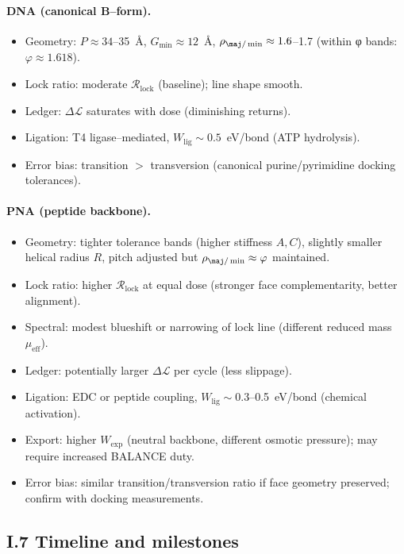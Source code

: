 \documentclass[11pt]{article}
\begin{document}
\paragraph{DNA (canonical B–form).}
\begin{itemize}
\item Geometry: $P\approx 34$–35~\AA, $G_{\min}\approx 12$~\AA, $\rho_{\maj/\min}\approx 1.6$–1.7 (within φ bands: $\varphi\approx 1.618$).
\item Lock ratio: moderate $\mathcal{R}_{\mathrm{lock}}$ (baseline); line shape smooth.
\item Ledger: $\Delta\mathcal{L}$ saturates with dose (diminishing returns).
\item Ligation: T4 ligase–mediated, $W_{\mathrm{lig}}\sim 0.5$~eV/bond (ATP hydrolysis).
\item Error bias: transition $>$ transversion (canonical purine/pyrimidine docking tolerances).
\end{itemize}

\paragraph{PNA (peptide backbone).}
\begin{itemize}
\item Geometry: tighter tolerance bands (higher stiffness $A,C$), slightly smaller helical radius $R$, pitch adjusted but $\rho_{\maj/\min}\approx\varphi$ maintained.
\item Lock ratio: higher $\mathcal{R}_{\mathrm{lock}}$ at equal dose (stronger face complementarity, better alignment).
\item Spectral: modest blueshift or narrowing of lock line (different reduced mass $\mu_{\mathrm{eff}}$).
\item Ledger: potentially larger $\Delta\mathcal{L}$ per cycle (less slippage).
\item Ligation: EDC or peptide coupling, $W_{\mathrm{lig}}\sim 0.3$–0.5~eV/bond (chemical activation).
\item Export: higher $W_{\mathrm{exp}}$ (neutral backbone, different osmotic pressure); may require increased \textsf{BALANCE} duty.
\item Error bias: similar transition/transversion ratio if face geometry preserved; confirm with docking measurements.
\end{itemize}

\subsection*{I.7 Timeline and milestones}
\end{document}
